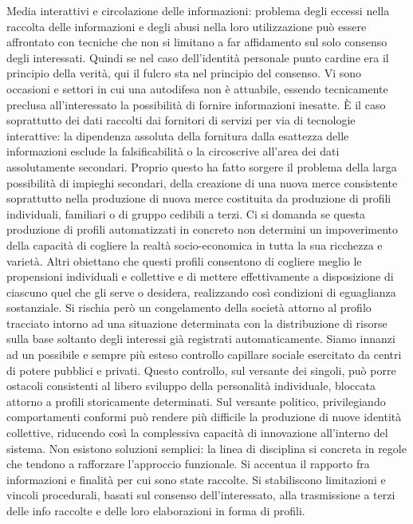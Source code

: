 Media interattivi e circolazione delle informazioni:
problema degli eccessi nella raccolta delle informazioni e degli abusi nella loro utilizzazione può essere affrontato con tecniche che non si limitano a far affidamento sul solo consenso degli interessati. Quindi se nel caso dell’identità personale punto cardine era il principio della verità, qui il fulcro sta nel principio del consenso.
Vi sono occasioni e settori in cui una autodifesa non è attuabile, essendo tecnicamente preclusa all’interessato la possibilità di fornire informazioni inesatte. È il caso soprattutto dei dati raccolti dai fornitori di servizi per via di tecnologie interattive: la dipendenza assoluta della fornitura dalla esattezza delle informazioni esclude la falsificabilità o la circoscrive all’area dei dati assolutamente secondari.
Proprio questo ha fatto sorgere il problema della larga possibilità di impieghi secondari, della creazione di una nuova merce consistente soprattutto nella produzione di nuova merce costituita da produzione di profili individuali, familiari o di gruppo cedibili a terzi. Ci si domanda se questa produzione di profili automatizzati in concreto non determini un impoverimento della capacità di cogliere la realtà socio-economica in tutta la sua ricchezza e varietà. Altri obiettano che questi profili consentono di cogliere meglio le propensioni individuali e collettive e di mettere effettivamente a disposizione di ciascuno quel che gli serve o desidera, realizzando così condizioni di eguaglianza sostanziale.
Si rischia però un congelamento della società attorno al profilo tracciato intorno ad una situazione determinata con la distribuzione di risorse sulla base soltanto degli interessi già registrati automaticamente.
Siamo innanzi ad un possibile e sempre più esteso controllo capillare sociale esercitato da centri di potere pubblici e privati. Questo controllo, sul versante dei singoli, può porre ostacoli consistenti al libero sviluppo della personalità individuale, bloccata attorno a profili storicamente determinati. Sul versante politico, privilegiando comportamenti conformi può rendere più difficile la produzione di nuove identità collettive, riducendo così la complessiva capacità di innovazione all’interno del sistema.
Non esistono soluzioni semplici: la linea di disciplina si concreta in regole che tendono a rafforzare l’approccio funzionale. Si accentua il rapporto fra informazioni e finalità per cui sono state raccolte. Si stabiliscono limitazioni e vincoli procedurali, basati sul consenso dell’interessato, alla trasmissione a terzi delle info raccolte e delle loro elaborazioni in forma di profili. 
